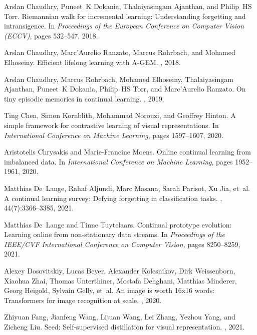 \documentclass[10pt,twocolumn,letterpaper]{article}
\begin{document}
{\begin{thebibliography}{10}
Arslan Chaudhry, Puneet~K Dokania, Thalaiyasingam Ajanthan, and Philip~HS Torr.
\newblock Riemannian walk for incremental learning: Understanding forgetting
  and intransigence.
\newblock In {\em Proceedings of the European Conference on Computer Vision
  (ECCV)}, pages 532--547, 2018.

Arslan Chaudhry, Marc'Aurelio Ranzato, Marcus Rohrbach, and Mohamed Elhoseiny.
\newblock Efficient lifelong learning with {A-GEM}.
, 2018.

Arslan Chaudhry, Marcus Rohrbach, Mohamed Elhoseiny, Thalaiyasingam Ajanthan,
  Puneet~K Dokania, Philip~HS Torr, and Marc'Aurelio Ranzato.
\newblock On tiny episodic memories in continual learning.
, 2019.

Ting Chen, Simon Kornblith, Mohammad Norouzi, and Geoffrey Hinton.
\newblock A simple framework for contrastive learning of visual
  representations.
\newblock In {\em International Conference on Machine Learning}, pages
  1597--1607, 2020.

Aristotelis Chrysakis and Marie-Francine Moens.
\newblock Online continual learning from imbalanced data.
\newblock In {\em International Conference on Machine Learning}, pages
  1952--1961, 2020.

Matthias De~Lange, Rahaf Aljundi, Marc Masana, Sarah Parisot, Xu Jia, et~al.
\newblock A continual learning survey: Defying forgetting in classification
  tasks.
,
  44(7):3366--3385, 2021.

Matthias De~Lange and Tinne Tuytelaars.
\newblock Continual prototype evolution: Learning online from non-stationary
  data streams.
\newblock In {\em Proceedings of the IEEE/CVF International Conference on
  Computer Vision}, pages 8250--8259, 2021.

Alexey Dosovitskiy, Lucas Beyer, Alexander Kolesnikov, Dirk Weissenborn,
  Xiaohua Zhai, Thomas Unterthiner, Mostafa Dehghani, Matthias Minderer, Georg
  Heigold, Sylvain Gelly, et~al.
\newblock An image is worth 16x16 words: Transformers for image recognition at
  scale.
, 2020.

Zhiyuan Fang, Jianfeng Wang, Lijuan Wang, Lei Zhang, Yezhou Yang, and Zicheng
  Liu.
\newblock Seed: Self-supervised distillation for visual representation.
, 2021.


\end{thebibliography}}
\end{document}
